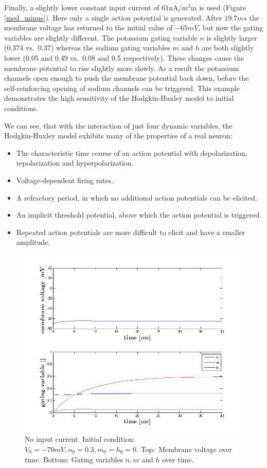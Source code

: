 \documentclass{scrartcl}
\begin{document}
Finally, a slightly lower constant input current of $61 \si{\nano\ampere\per\square\milli\meter}$ is used (Figure \ref{med_minus}). Here only a single action potential is generated. After $19.7 \si{ms}$ the membrane voltage has returned to the initial value of $-65\si{mV}$, but now the gating variables are slightly different. The potassium gating variable $n$ is slightly larger (0.374 vs.\ 0.37) whereas the sodium gating variables $m$ and $h$ are both slightly lower (0.05 and 0.49 vs.\ 0.08 and 0.5 respectively). These changes cause the membrane potential to rise slightly more slowly. As a result the potassium channels open enough to push the membrane potential back down, before the self-reinforcing opening of sodium channels can be triggered. This example demonstrates the high sensitivity of the Hodgkin-Huxley model to initial conditions.

We can see, that with the interaction of just four dynamic variables, the Hodgkin-Huxley model exhibits many of the properties of a real neuron:
\begin{itemize}
\item The characteristic time course of an action potential with depolarization, repolarization and hyperpolarization.
\item Voltage-dependent firing rates.
\item A refractory period, in which no additional action potentials can be elicited.
\item An implicit threshold potential, above which the action potential is triggered.
\item Repeated action potentials are more difficult to elicit and have a smaller amplitude.
\end{itemize}

\begin{figure}
\centering
\includegraphics[trim = {1.4cm 0.3 1.8cm 1cm}, height=0.35\textheight, clip]{../pics/zero}
\caption{No input current. Initial condition: $V_0 = -70\si{mV}, n_0 = 0.3, m_0 = h_0 = 0$. Top:~Membrane voltage over time. Bottom: Gating variables $n, m$ and $h$ over time.}
\label{zero}
\end{figure}
\end{document}
